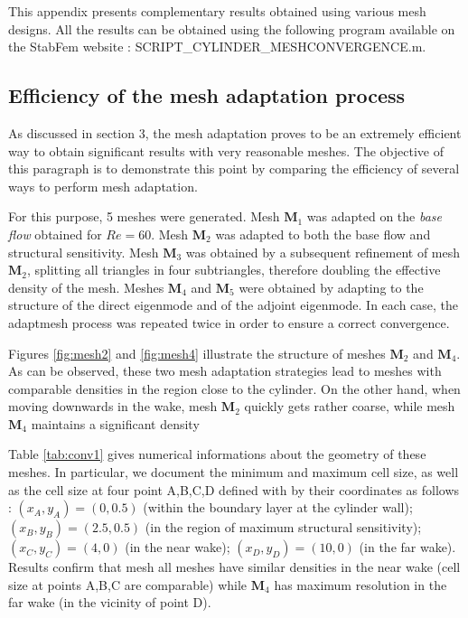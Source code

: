 \documentclass[twocolumn,10pt]{asme2ej}
\begin{document}
This appendix presents complementary results obtained using various mesh designs. 
All the results can be obtained using the following program available on the StabFem website : 
{\sf SCRIPT\_CYLINDER\_MESHCONVERGENCE.m}.

\subsection{Efficiency of the mesh adaptation process}

As discussed in section 3, the mesh adaptation proves to be an extremely efficient way to obtain significant results 
with very reasonable meshes. The objective of this paragraph is to demonstrate this point by comparing the efficiency of several ways to perform mesh adaptation. 

For this purpose, 5 meshes were generated. 
Mesh $\mathbf{M}_1$ was adapted on the {\em base flow} obtained for $Re=60$.
Mesh $\mathbf{M}_2$ was adapted to both the base flow and structural sensitivity.
Mesh $\mathbf{M}_3$ was obtained by a subsequent refinement of mesh $\mathbf{M}_2$, splitting all triangles in four subtriangles, therefore doubling the effective density of the mesh.
Meshes $\mathbf{M}_4$ and $\mathbf{M}_5$ were obtained by adapting to the structure of the direct eigenmode and of the adjoint eigenmode.
In each case, the adaptmesh process was repeated twice in order to ensure a correct convergence.

Figures \ref{fig:mesh2} and \ref{fig:mesh4} illustrate the structure of meshes $\mathbf{M}_2$ and $\mathbf{M}_4$. As can be observed, these two mesh adaptation strategies lead to meshes with comparable densities in the region close to the cylinder. On the other hand, when moving downwards in the wake, mesh $\mathbf{M}_2$ quickly gets rather coarse, while mesh $\mathbf{M}_4$ maintains a significant density  

Table \ref{tab:conv1} gives numerical informations about the geometry of these meshes. In particular, we document the minimum and maximum cell size, as well as the cell size at four point A,B,C,D defined with by their coordinates as follows : $(x_A,y_A) = (0,0.5)$ (within the boundary layer at the cylinder wall); $(x_B,y_B) = (2.5,0.5)$ (in the region of maximum structural sensitivity); $(x_C,y_C) = (4,0)$ (in the near wake); $(x_D,y_D) = (10,0)$ (in the far wake). Results confirm that mesh all meshes have similar densities in the near wake (cell size at points A,B,C are comparable) 
while $\mathbf{M}_4$ has maximum resolution in the far wake (in the vicinity of point D).
\end{document}
